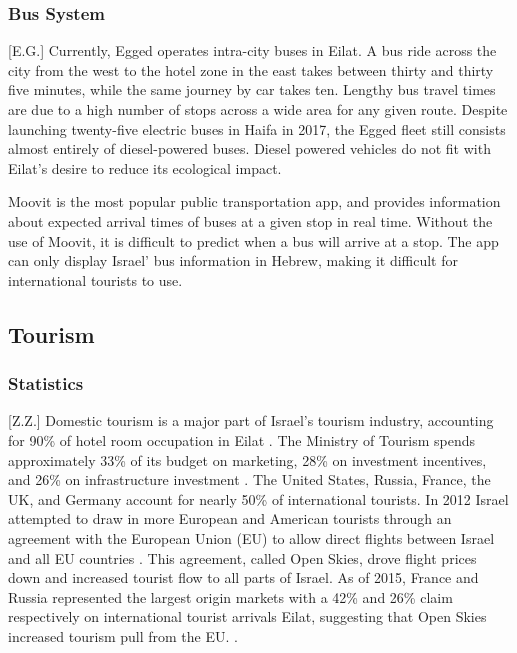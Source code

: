 \documentclass[12pt]{article}                       %
\begin{document}
\subsubsection{Bus System}[E.G.]
Currently, Egged operates intra-city buses in Eilat. A bus ride across the city from the west to the hotel zone in the east takes between thirty and thirty five minutes, while the same journey by car takes ten. Lengthy bus travel times are due to a high number of stops across a wide area for any given route. Despite launching twenty-five electric buses in Haifa in 2017, the Egged fleet still consists almost entirely of diesel-powered buses. Diesel powered vehicles do not fit with Eilat's desire to reduce its ecological impact.



Moovit is the most popular public transportation app, and provides information about expected arrival times of buses at a given stop in real time. Without the use of Moovit, it is difficult to predict when a bus will arrive at a stop. The app can only display Israel' bus information in Hebrew, making it difficult for international tourists to use.

\subsection{Tourism}
\subsubsection{Statistics}[Z.Z.]
Domestic tourism is a major part of Israel's tourism industry, accounting for 90\% of hotel room occupation in Eilat \cite{Benner2017UpgradingEilat}. The Ministry of Tourism spends approximately 33\% of its budget on marketing, 28\% on investment incentives, and 26\% on infrastructure investment \cite{Benner2017UpgradingEilat}. The United States, Russia, France, the UK, and Germany account for nearly 50\% of international tourists. In 2012 Israel attempted to draw in more European and American tourists through an agreement with the European Union (EU) to allow direct flights between Israel and all EU countries \cite{Benner2017UpgradingEilat}. This agreement, called Open Skies, drove flight prices down and increased tourist flow to all parts of Israel. As of 2015, France and Russia represented the largest origin markets with a 42\% and 26\% claim respectively on international tourist arrivals Eilat, suggesting that Open Skies increased tourism pull from the EU. \cite{Benevolo2016SmartBenefits}.
\end{document}
